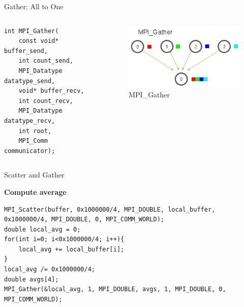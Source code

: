\begin{frame}[fragile]{Gather: All to One}
    \begin{columns}
    
\begin{column}{.5\textwidth}
\begin{verbatim}
int MPI_Gather(
    const void* buffer_send,
    int count_send,
    MPI_Datatype datatype_send,
    void* buffer_recv,
    int count_recv,
    MPI_Datatype datatype_recv,
    int root,
    MPI_Comm communicator);
\end{verbatim}

\end{column}

\begin{column}{.5\textwidth}
\begin{figure}
    \centering
    \includegraphics[width=0.75\linewidth]{day8_am/img/mpi/gather.png}
    \caption{MPI\_Gather}
\end{figure}
\end{column}
\end{columns}
\end{frame}

\begin{frame}[fragile]{Scatter and Gather}
    \begin{example}
        \textbf{Compute average}
    \end{example}
     \begin{verbatim}
MPI_Scatter(buffer, 0x1000000/4, MPI_DOUBLE, local_buffer, 0x1000000/4, MPI_DOUBLE, 0, MPI_COMM_WORLD);
double local_avg = 0;
for(int i=0; i<0x1000000/4; i++){
    local_avg += local_buffer[i];
}
local_avg /= 0x1000000/4;
double avgs[4];
MPI_Gather(&local_avg, 1, MPI_DOUBLE, avgs, 1, MPI_DOUBLE, 0, MPI_COMM_WORLD);
\end{verbatim}
\end{frame}

